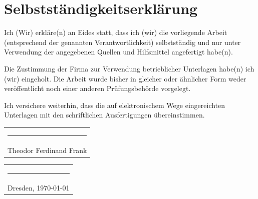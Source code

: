 \documentclass[12pt,a4paper]{article}
\begin{document}


\newpage
\thispagestyle{empty}
\section*{Selbstständigkeitserklärung}

Ich (Wir) erkläre(n) an Eides statt, dass ich (wir) die vorliegende Arbeit (entsprechend der genannten Verantwortlichkeit) selbstständig und nur unter Verwendung der angegebenen Quellen und Hilfsmittel angefertigt habe(n). 
\medskip

Die Zustimmung der Firma zur Verwendung betrieblicher Unterlagen habe(n) ich (wir) eingeholt. Die Arbeit wurde bisher in gleicher oder ähnlicher Form weder veröffentlicht noch einer anderen Prüfungsbehörde vorgelegt.
\medskip

Ich versichere weiterhin, dass die auf elektronischem Wege eingereichten Unterlagen mit den schriftlichen Ausfertigungen übereinstimmen.

\vspace{15mm}
\hfill%
\begin{tabular}[t]{c}
	\rule{10em}{0.4pt} \\ Theodor Ferdinand Frank
\end{tabular}%
\hfill%
\begin{tabular}[t]{c}
	\rule{10em}{0.4pt} \\ Dresden, \today
\end{tabular}%
\hfill\strut
\end{document}
